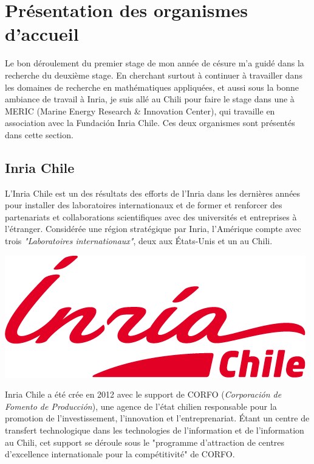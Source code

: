 \section{Présentation des organismes d'accueil}

\indent Le bon déroulement du premier stage de mon année de césure m'a guidé dans la recherche du deuxième stage. En cherchant surtout à continuer à travailler dans les domaines de recherche en mathématiques appliquées, et aussi sous la bonne ambiance de travail à Inria, je suis allé au Chili pour faire le stage dans une à MERIC (Marine Energy Research \& Innovation Center), qui travaille en association avec la Fundación Inria Chile. Ces deux organismes sont présentés dans cette section.

\subsection{Inria Chile}

\indent L'Inria Chile est un des résultats des efforts de l'Inria dans les dernières années pour installer des laboratoires internationaux et de former et renforcer des partenariats et collaborations scientifiques avec des universités et entreprises à l'étranger. Considérée une région stratégique par Inria, l'Amérique compte avec trois \emph{"Laboratoires internationaux"}, deux aux États-Unis et un au Chili.

\indent
\begingroup
\centering
\includegraphics[scale=.3]{figures/logos/Inria-Chile.png}
\endgroup

\indent Inria Chile a été crée en 2012 avec le support de CORFO (\emph{Corporación de Fomento de Producción}), une agence de l'état chilien responsable pour la promotion de l'investissement, l'innovation et l'entreprenariat. Étant un centre de transfert technologique dans les technologies de l'information et de  l'information au Chili, cet support se déroule sous le "programme d'attraction de centres d'excellence internationale pour la compétitivité" de CORFO.

